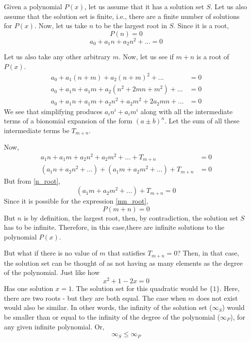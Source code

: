 \documentclass[12pt]{article}
\begin{document}
Given a polynomial $P(x)$, let us assume that it has a solution set $S$.
Let us also assume that the solution set is finite, i.e., there are a finite number of solutions for $P(x)$.
Now, let us take $n$ to be the largest root in $S$.
Since it is a root, 
\[
    P(n) = 0
\]
\begin{equation} \label{n_root}
     a_0 + a_1n + a_2n^2 + ... = 0
\end{equation}
   
Let us also take any other arbitrary $m$.
Now, let us see if $m + n$ is a root of $P(x)$.
\begin{align*}
    a_0 + a_1(n + m) + a_2(n + m)^2 + ... &= 0\\
    a_0 + a_1n + a_1m + a_2(n^2 + 2mn + m^2) + ... &= 0\\
    a_0 + a_1n + a_1m + a_2n^2 + a_2m^2 + 2a_2mn + ... &= 0
\end{align*}
We see that simplifying produces $a_in^i + a_im^i$ along with all the intermediate terms of a bionomial expansion of the form $(a \pm b)^n$.
Let the sum of all these intermediate terms be $T_{m + n}$.

Now, 
\begin{align*}
    a_1n + a_1m + a_2n^2 + a_2m^2 + ... + T_{m+n} &= 0\\
    (a_1n + a_2n^2 + ...) + (a_1m + a_2m^2 + ...) + T_{m+n} &= 0
\end{align*}
But from \ref{n_root}, 
\begin{equation} \label{mn_root}
    (a_1m + a_2m^2 + ...) + T_{m+n} = 0
\end{equation}
Since it is possible for the expression \ref{mn_root}, 
\[P(m+n)=0\]
But $n$ is by definition, the largest root, then, by contradiction, the solution set $S$ has to be infinite.
Therefore, in this case,there are infinite solutions to the polynomial $P(x)$.

But what if there is no value of $m$ that satisfies $T_{m+n}=0$? Then, in that case, the solution set can be thought of as not having as many elements as the degree of the polynomial.
Just like how 
\[
    x^2 + 1 - 2x = 0
\]
Has one solution $x=1$.
The solution set for this quadratic would be $\{1\}$.
Here, there are two roots - but they are both equal. The case when $m$ does not exist would also be similar.
In other words, the infinity of the solution set ($\infty_{S}$) would be smaller than or equal to the infinity of the degree of the polynomial ($\infty_{P}$), for any given infinite polynomial.
Or,
\begin{equation}
    \infty_{S} \leqslant \infty_{P}
\end{equation}
\end{document}
